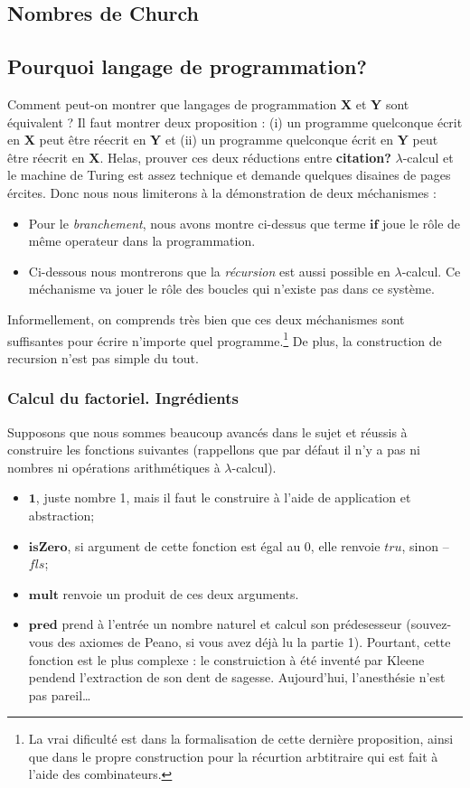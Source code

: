 \subsection*{Nombres de Church}

\subsection*{Pourquoi langage de programmation?}

Comment peut-on montrer que langages de programmation \textbf{X} et \textbf{Y} sont équivalent ?
Il faut montrer deux proposition : (i) un programme quelconque écrit en \textbf{X} peut être réecrit en \textbf{Y} et (ii) un programme quelconque écrit en \textbf{Y} peut être réecrit en \textbf{X}.
Helas, prouver ces deux réductions entre \textbf{citation?} $\lambda$-calcul et le machine de Turing est assez technique et demande quelques disaines de pages ércites.
Donc nous nous limiterons à la démonstration de deux méchanismes :
\begin{itemize}
	\item Pour le \emph{branchement}, nous avons montre ci-dessus que terme $\mathbf{if}$ joue le rôle de même operateur dans la programmation.
	\item Ci-dessous nous montrerons que la \emph{récursion} est aussi possible en $\lambda$-calcul. Ce méchanisme va jouer le rôle des boucles qui n'existe pas dans ce système.
\end{itemize}
Informellement, on comprends très bien que ces deux méchanismes sont suffisantes pour écrire n'importe quel programme.\footnote{La vrai dificulté est dans la formalisation de cette dernière proposition, ainsi que dans le propre construction pour la récurtion arbtitraire qui est fait à l'aide des combinateurs.}
De plus, la construction de recursion n'est pas simple du tout.

\subsubsection*{Calcul du factoriel. Ingrédients}
Supposons que nous sommes beaucoup avancés dans le sujet et réussis à construire les fonctions suivantes (rappellons que par défaut il n'y a pas ni nombres ni opérations arithmétiques à $\lambda$-calcul).
\begin{itemize}
	\item $\mathbf{1}$, juste nombre 1, mais il faut le construire à l'aide de application et abstraction;
	\item $\mathbf{isZero}$, si argument de cette fonction est égal au 0, elle renvoie $tru$, sinon -- $fls$;
	\item $\mathbf{mult}$ renvoie un produit de ces deux arguments.
	\item $\mathbf{pred}$ prend à l'entrée un nombre naturel et calcul son prédesesseur (souvez-vous des axiomes de Peano, si vous avez déjà lu la partie 1). Pourtant, cette fonction est le plus complexe : le construiction à été inventé par Kleene pendend l'extraction de son dent de sagesse. Aujourd'hui, l'anesthésie n'est pas pareil\ldots
\end{itemize}
